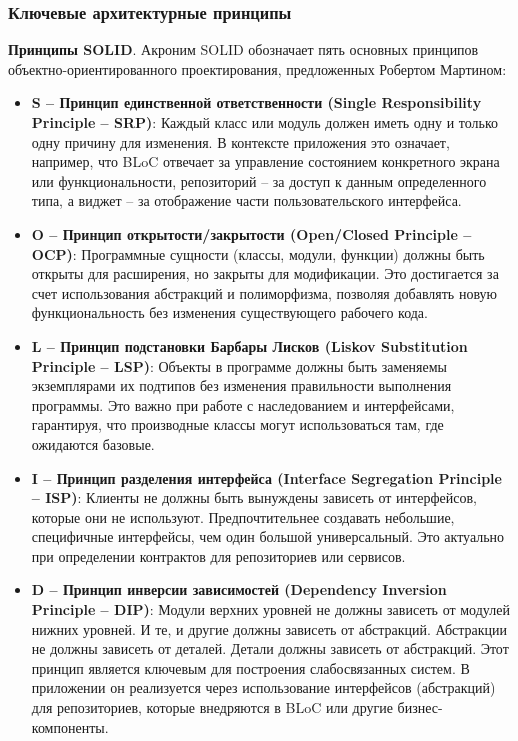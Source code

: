 \subsubsection*{Ключевые архитектурные принципы}
\textbf{Принципы SOLID}.
Акроним SOLID обозначает пять основных принципов объектно-ориентированного проектирования, предложенных Робертом Мартином:
\begin{itemize}
    \item \textbf{S – Принцип единственной ответственности (Single Responsibility \\ Principle – SRP)}: Каждый класс или модуль должен иметь одну и только одну причину для изменения. В контексте приложения это означает, например, что BLoC отвечает за управление состоянием конкретного экрана или функциональности, репозиторий – за доступ к данным определенного типа, а виджет – за отображение части пользовательского интерфейса.
    \item \textbf{O – Принцип открытости/закрытости (Open/Closed Principle – OCP)}: Программные сущности (классы, модули, функции) должны быть открыты для расширения, но закрыты для модификации. Это достигается за счет использования абстракций и полиморфизма, позволяя добавлять новую функциональность без изменения существующего рабочего кода.
    \item \textbf{L – Принцип подстановки Барбары Лисков (Liskov Substitution Principle – LSP)}: Объекты в программе должны быть заменяемы экземплярами их подтипов без изменения правильности выполнения программы. Это важно при работе с наследованием и интерфейсами, гарантируя, что производные классы могут использоваться там, где ожидаются базовые.
    \item \textbf{I – Принцип разделения интерфейса (Interface Segregation Principle – ISP)}: Клиенты не должны быть вынуждены зависеть от интерфейсов, которые они не используют. Предпочтительнее создавать небольшие, специфичные интерфейсы, чем один большой универсальный. Это актуально при определении контрактов для репозиториев или сервисов.
    \item \textbf{D – Принцип инверсии зависимостей (Dependency Inversion Principle – DIP)}: Модули верхних уровней не должны зависеть от модулей нижних уровней. И те, и другие должны зависеть от абстракций. Абстракции не должны зависеть от деталей. Детали должны зависеть от абстракций. Этот принцип является ключевым для построения слабосвязанных систем. В приложении он реализуется через использование интерфейсов (абстракций) для репозиториев, которые внедряются в BLoC или другие бизнес-компоненты.
\end{itemize}

